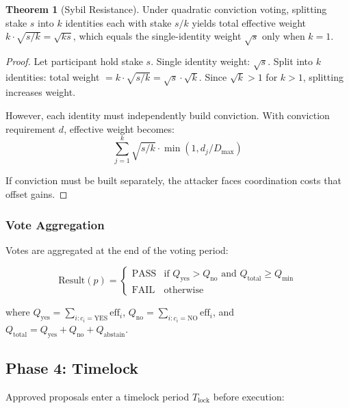 \documentclass[11pt,a4paper]{article}
\theoremstyle{definition}
\newtheorem{theorem}{Theorem}[section]
\theoremstyle{remark}
\begin{document}
\begin{theorem}[Sybil Resistance]
Under quadratic conviction voting, splitting stake $s$ into $k$ identities each with stake $s/k$ yields total effective weight $k \cdot \sqrt{s/k} = \sqrt{ks}$, which equals the single-identity weight $\sqrt{s}$ only when $k = 1$.
\end{theorem}

\begin{proof}
Let participant hold stake $s$. Single identity weight: $\sqrt{s}$.
Split into $k$ identities: total weight $= k \cdot \sqrt{s/k} = \sqrt{s} \cdot \sqrt{k}$.
Since $\sqrt{k} > 1$ for $k > 1$, splitting increases weight.

However, each identity must independently build conviction. With conviction requirement $d$, effective weight becomes:
\begin{equation}
    \sum_{j=1}^{k} \sqrt{s/k} \cdot \min(1, d_j/D_{\max})
\end{equation}

If conviction must be built separately, the attacker faces coordination costs that offset gains.
\end{proof}

\subsubsection{Vote Aggregation}

Votes are aggregated at the end of the voting period:

\begin{equation}
    \text{Result}(p) = \begin{cases}
        \text{PASS} & \text{if } Q_{\text{yes}} > Q_{\text{no}} \text{ and } Q_{\text{total}} \geq Q_{\min} \\
        \text{FAIL} & \text{otherwise}
    \end{cases}
\end{equation}

where $Q_{\text{yes}} = \sum_{i: c_i = \text{YES}} \text{eff}_i$, $Q_{\text{no}} = \sum_{i: c_i = \text{NO}} \text{eff}_i$, and $Q_{\text{total}} = Q_{\text{yes}} + Q_{\text{no}} + Q_{\text{abstain}}$.

\subsection{Phase 4: Timelock}

Approved proposals enter a timelock period $T_{\text{lock}}$ before execution:
\end{document}
